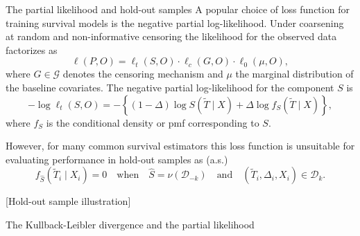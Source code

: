 \documentclass[smaller]{beamer}\usepackage{listings}
\newcommand{\est}{\ensuremath{\nu}}
\begin{document}
\begin{frame}[label={sec:org59f7cac}]{The partial likelihood and hold-out samples}
A popular choice of loss function for training survival models is the negative partial
log-likelihood. Under coarsening at random and non-informative censoring the likelihood for the
observed data factorizes as
\begin{equation*}
  \ell(P, O) = \ell_t(S, O) \cdot \ell_c(G, O) \cdot \ell_0(\mu, O),
\end{equation*}
where \(G \in \mathcal{G} \) denotes the censoring mechanism and $\mu$ the marginal distribution of
the baseline covariates. The negative partial log-likelihood for the component \(S\) is
\begin{equation*}
  - \log \ell_t(S, O)
  = -
  \left\{
    (1-\Delta) \log S(\tilde T \mid X)
    + \Delta \log f_S(\tilde T \mid X)
  \right\},
\end{equation*}
where \(f_S\) is the conditional density or pmf corresponding to \(S\). \vfill

However, for many common survival estimators this loss function is unsuitable for evaluating
performance in hold-out samples as (a.s.)
\begin{equation*}
  f_{\hat S}(\tilde T_i \mid X_i) = 0
  \quad \text{when} \quad
  \hat S =\est(\mathcal{D}_{-k})
  \quad \text{and} \quad
  (\tilde T_i, \Delta_i, X_i) \in \mathcal{D}_k.
\end{equation*}
\end{frame}

\begin{frame}[label={sec:org7d6c41d}]{[Hold-out sample illustration]}
\end{frame}

\begin{frame}[label={sec:orga2edde5}]{The Kullback-Leibler divergence and the partial likelihood}
\end{frame}
\end{document}
